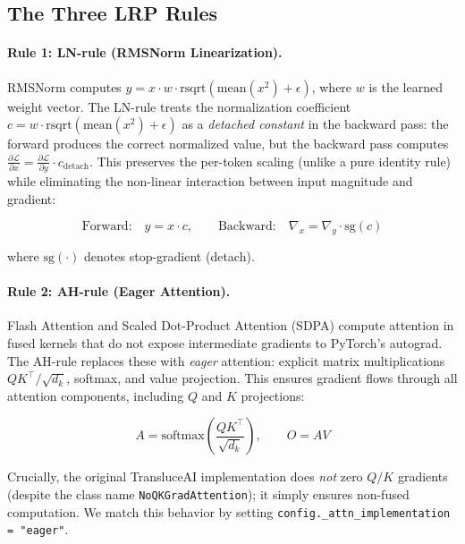 \documentclass[11pt]{article}
\begin{document}
\subsection{The Three LRP Rules}
\label{sec:lrp_rules}

\paragraph{Rule 1: LN-rule (RMSNorm Linearization).}
RMSNorm computes $y = x \cdot w \cdot \text{rsqrt}(\text{mean}(x^2) + \epsilon)$, where $w$ is the learned weight vector.
The LN-rule treats the normalization coefficient $c = w \cdot \text{rsqrt}(\text{mean}(x^2) + \epsilon)$ as a \emph{detached constant} in the backward pass: the forward produces the correct normalized value, but the backward pass computes $\frac{\partial \mathcal{L}}{\partial x} = \frac{\partial \mathcal{L}}{\partial y} \cdot c_{\text{detach}}$.
This preserves the per-token scaling (unlike a pure identity rule) while eliminating the non-linear interaction between input magnitude and gradient:

\begin{equation}
    \text{Forward:} \quad y = x \cdot c, \qquad
    \text{Backward:} \quad \nabla_x = \nabla_y \cdot \text{sg}(c)
\label{eq:ln_rule}
\end{equation}

where $\text{sg}(\cdot)$ denotes stop-gradient (detach).

\paragraph{Rule 2: AH-rule (Eager Attention).}
Flash Attention and Scaled Dot-Product Attention (SDPA) compute attention in fused kernels that do not expose intermediate gradients to PyTorch's autograd.
The AH-rule replaces these with \emph{eager} attention: explicit matrix multiplications $QK^\top / \sqrt{d_k}$, softmax, and value projection.
This ensures gradient flows through all attention components, including $Q$ and $K$ projections:

\begin{equation}
    A = \text{softmax}\left(\frac{QK^\top}{\sqrt{d_k}}\right), \qquad O = AV
\end{equation}

Crucially, the original TransluceAI implementation does \emph{not} zero $Q/K$ gradients (despite the class name \texttt{NoQKGradAttention}); it simply ensures non-fused computation.
We match this behavior by setting \texttt{config.\_attn\_implementation = "eager"}.
\end{document}
